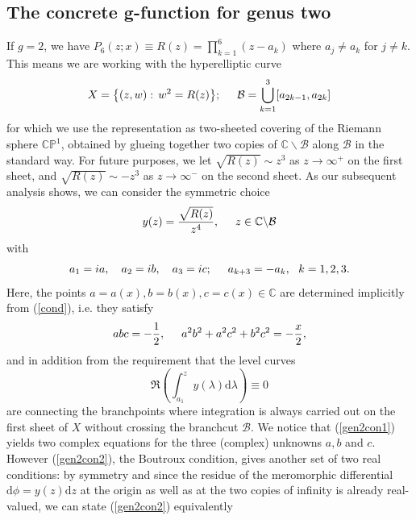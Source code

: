 \documentclass[10pt,oneside,reqno]{amsart}
\numberwithin{equation}{section}
\renewcommand{\d}{{\mathrm d}}
\def\eqref#1{(\ref{#1})}
\begin{document}
\subsection{The concrete g-function for genus two}\label{ggen2} If $g=2$, we have $P_6(z;x)\equiv R(z) = \prod_{k=1}^6(z-a_k)$ where $a_j\neq a_k$ for $j\neq k$. This means we are
working with the hyperelliptic curve
\begin{equation}\label{hyperell}
 X=\big\{(z,w):\,w^2=R(z)\big\};\hspace{0.5cm}\mathcal{B}=\bigcup_{k=1}^3[a_{2k-1},a_{2k}]
\end{equation}
for which we use the representation as two-sheeted covering of the Riemann sphere $\mathbb{C}\mathbb{P}^1$, obtained by glueing together two copies of $\mathbb{C}\backslash\mathcal{B}$ along
$\mathcal{B}$ in the standard way. For future purposes, we let $\sqrt{R(z)}\sim z^3$ as $z\rightarrow\infty^+$ on the first sheet, and $\sqrt{R(z)}\sim -z^3$ as $z\rightarrow
\infty^-$ on the second sheet. As our subsequent analysis shows, we can consider the symmetric choice
\begin{equation}\label{ygen2}
 y(z)=\frac{\sqrt{R(z)}}{z^4},\hspace{0.5cm}z\in\mathbb{C}\backslash\mathcal{B}
\end{equation}
with
\begin{equation*}
  a_1=ia,\ \ \ a_2=ib,\ \ \ a_3=ic;\hspace{0.5cm}a_{k+3}=-a_k,\ \ k=1,2,3.
\end{equation*}
Here, the points $a=a(x),b=b(x),c=c(x)\in\mathbb{C}$ are determined implicitly from \eqref{cond}, i.e. they satisfy
\begin{equation}\label{gen2con1}
  abc=-\frac{1}{2},\hspace{0.5cm}a^2b^2+a^2c^2+b^2c^2=-\frac{x}{2},
\end{equation}
and in addition from the requirement that the level curves
\begin{equation}\label{gen2con2}
 \Re\left(\int_{a_1}^zy(\lambda)\d\lambda\right)\equiv 0
\end{equation}
are connecting the branchpoints where integration is always carried out on the first sheet of $X$ without crossing the branchcut $\mathcal{B}$. We notice that \eqref{gen2con1}
yields two complex equations for the three (complex) unknowns $a,b$ and $c$. However \eqref{gen2con2}, the Boutroux condition, gives another set of two real conditions: by symmetry and since
the residue of the meromorphic differential $\d\phi=y(z)\d z$ at the origin as well as at the two copies of infinity is already real-valued, we can state \eqref{gen2con2} equivalently
\end{document}
